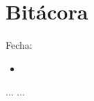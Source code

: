 
\maketitle

\part{Bitácora}
\begin{entry}{Fecha:}
\tcbsubtitle{\LBlimportant}
\begin{itemize}
    \item 
\end{itemize}
\tcblower
\tcbsubtitle{\LBlsummary}
...
\vspace{0.4em}
\tcbsubtitle{\LBltodo}
...
\end{entry}
